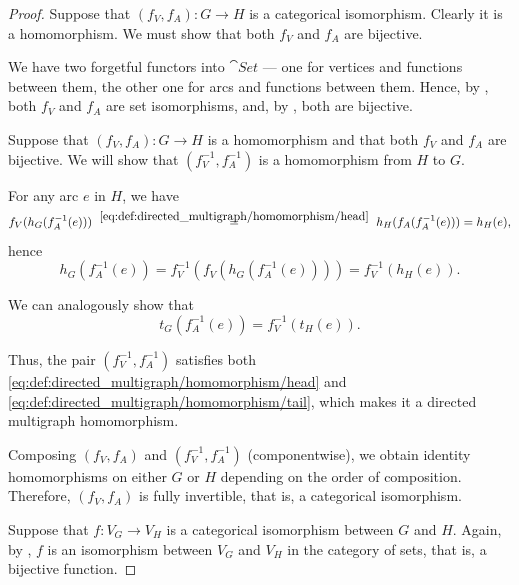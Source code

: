 \begin{proof}

  \SufficiencySubProof* Suppose that \( (f_V, f_A): G \to H \) is a categorical isomorphism. Clearly it is a homomorphism. We must show that both \( f_V \) and \( f_A \) are bijective.

  We have two forgetful functors into \( \cat{Set} \) --- one for vertices and functions between them, the other one for arcs and functions between them. Hence, by , both \( f_V \) and \( f_A \) are set isomorphisms, and, by , both are bijective.

  \NecessitySubProof* Suppose that \( (f_V, f_A): G \to H \) is a homomorphism and that both \( f_V \) and \( f_A \) are bijective. We will show that \( (f_V^{-1}, f_A^{-1}) \) is a homomorphism from \( H \) to \( G \).

  For any arc \( e \) in \( H \), we have
  \begin{equation*}
    f_V(h_G(f^{-1}_A(e)))
    \reloset {\eqref{eq:def:directed_multigraph/homomorphism/head}} =
    h_H(f_A(f^{-1}_A(e)))
    =
    h_H(e),
  \end{equation*}
  hence
  \begin{equation*}
    h_G(f^{-1}_A(e))
    =
    f_V^{-1}(f_V(h_G(f^{-1}_A(e))))
    =
    f_V^{-1}(h_H(e)).
  \end{equation*}

  We can analogously show that
  \begin{equation*}
    t_G(f^{-1}_A(e)) = f_V^{-1}(t_H(e)).
  \end{equation*}

  Thus, the pair \( (f_V^{-1},f_A^{-1}) \) satisfies both \eqref{eq:def:directed_multigraph/homomorphism/head} and \eqref{eq:def:directed_multigraph/homomorphism/tail}, which makes it a directed multigraph homomorphism.

  Composing \( (f_V, f_A) \) and \( (f_V^{-1}, f_A^{-1}) \) (componentwise), we obtain identity homomorphisms on either \( G \) or \( H \) depending on the order of composition. Therefore, \( (f_V, f_A) \) is fully invertible, that is, a categorical isomorphism.


  \SufficiencySubProof* Suppose that \( f: V_G \to V_H \) is a categorical isomorphism between \( G \) and \( H \). Again, by , \( f \) is an isomorphism between \( V_G \) and \( V_H \) in the category of sets, that is, a bijective function.


\end{proof}
